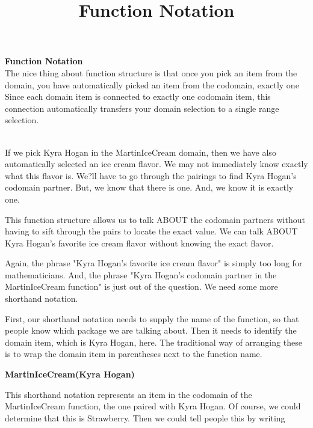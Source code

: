 \documentclass{ximera}
\title{Function Notation}
\begin{document}
\begin{abstract}
\end{abstract}

\maketitle




\begin{remark} \textbf{Function Notation} \\
The nice thing about function structure is that once you pick an item from the domain, you have automatically picked an item from the codomain, exactly one  Since each domain item is connected to exactly one codomain item, this connection automatically transfers your domain selection to a single range selection.
\end{remark}
\quad \\


If we pick Kyra Hogan in the MartinIceCream domain, then we have also automatically selected an ice cream flavor.  We may not immediately know exactly what this flavor is. We?ll have to go through the pairings to find Kyra Hogan's codomain partner.  But, we know that there is one. And, we know it is exactly one.

This function structure allows us to talk ABOUT the codomain partners without having to sift through the pairs to locate the exact value.  We can talk ABOUT Kyra Hogan's favorite ice cream flavor without knowing the exact flavor.  

Again, the phrase "Kyra Hogan's favorite ice cream flavor" is simply too long for mathematicians. And, the phrase "Kyra Hogan's codomain partner in the MartinIceCream function" is just out of the question. We need some more shorthand notation.

First, our shorthand notation needs to supply the name of the function, so that people know which package we are talking about.  Then it needs to identify the domain item, which is Kyra Hogan, here.  The traditional way of arranging these is to wrap the domain item in parentheses next to the function name.

\begin{center}
\textbf{MartinIceCream(Kyra Hogan)}
\end{center}

This shorthand notation represents an item in the codomain of the MartinIceCream function, the one paired with Kyra Hogan.  Of course, we could determine that this is Strawberry.  Then we could tell people this by writing
\end{document}

